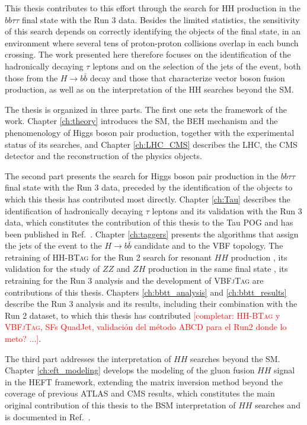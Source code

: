 This thesis contributes to this effort through the search for HH production in the $bb\tau\tau$ final state with the Run 3 data. Besides the limited statistics, the sensitivity of this search depends on correctly identifying the objects of the final state, in an environment where several tens of proton-proton collisions overlap in each bunch crossing. The work presented here therefore focuses on the identification of the hadronically decaying $\tau$ leptons and on the selection of the jets of the event, both those from the $H\to b\bar{b}$ decay and those that characterize vector boson fusion production, as well as on the interpretation of the HH searches beyond the SM.

The thesis is organized in three parts. The first one sets the framework of the work. Chapter \ref{ch:theory} introduces the SM, the BEH mechanism and the phenomenology of Higgs boson pair production, together with the experimental status of its searches, and Chapter \ref{ch:LHC_CMS} describes the LHC, the CMS detector and the reconstruction of the physics objects.

The second part presents the search for Higgs boson pair production in the $bb\tau\tau$ final state with the Run 3 data, preceded by the identification of the objects to which this thesis has contributed most directly. Chapter \ref{ch:Tau} describes the identification of hadronically decaying $\tau$ leptons and its validation with the Run 3 data, which constitutes the contribution of this thesis to the Tau POG and has been published in Ref.~\cite{CMS-DP-2025-074}. Chapter \ref{ch:taggers} presents the algorithms that assign the jets of the event to the $H\to b\bar{b}$ candidate and to the VBF topology. The retraining of \textsc{HH-BTag} for the Run 2 search for resonant $HH$ production \cite{CMS-PAS-B2G-24-011}, its validation for the study of $ZZ$ and $ZH$ production in the same final state \cite{CMS:2026zzzh}, its retraining for the Run 3 analysis and the development of \textsc{VBFjTag} are contributions of this thesis. Chapters \ref{ch:bbtt_analysis} and \ref{ch:bbtt_results} describe the Run 3 analysis \cite{CMS-PAS-HIG-25-008} and its results, including their combination with the Run 2 dataset, to which this thesis has contributed \textcolor{red}{[completar: \textsc{HH-BTag} y \textsc{VBFjTag}, SFs QuadJet, validación del método ABCD para el Run2 donde lo meto? ...]}.

The third part addresses the interpretation of $HH$ searches beyond the SM. Chapter \ref{ch:eft_modeling} develops the modeling of the gluon fusion $HH$ signal in the HEFT framework, extending the matrix inversion method beyond the coverage of previous ATLAS and CMS results, which constitutes the main original contribution of this thesis to the BSM interpretation of $HH$ searches and is documented in Ref.~\cite{LHCHWG-2026-015}.


